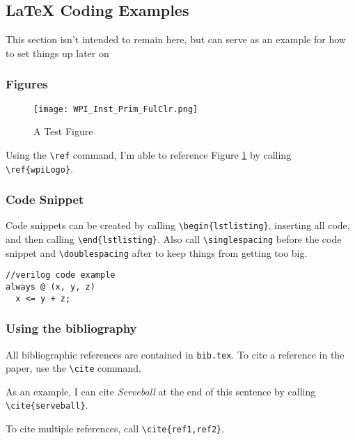 \newpage
\subsection{LaTeX Coding Examples}
This section isn't intended to remain here, but can serve as an example for how to set things up later on

\subsubsection{Figures} 
\begin{figure}[H]
	\centerline{\texttt{[image: WPI\_Inst\_Prim\_FulClr.png]}}
	\caption{A Test Figure}
	\label{wpiLogo}
\end{figure}

Using the \verb!\ref! command, I'm able to reference Figure \ref{wpiLogo} by calling \verb!\ref{wpiLogo}!.

\subsubsection{Code Snippet}
Code snippets can be created by calling \verb!\begin{lstlisting}!, inserting all code, and then calling \verb!\end{lstlisting}!. Also call \verb!\singlespacing! before the code snippet and \verb!\doublespacing! after to keep things from getting too big.
\singlespacing %
\begin{lstlisting}
//verilog code example
always @ (x, y, z)
  x <= y + z;
\end{lstlisting}
\doublespacing %

\subsubsection{Using the bibliography}
All bibliographic references are contained in \texttt{bib.tex}. To cite a reference in the paper, use the \verb!\cite! command.
\par
As an example, I can cite \textit{Serveball} at the end of this sentence by calling \verb!\cite{serveball}!.\cite{serveball}
\par
To cite multiple references, call \verb!\cite{ref1,ref2}!.\cite{serveball,porikli}
